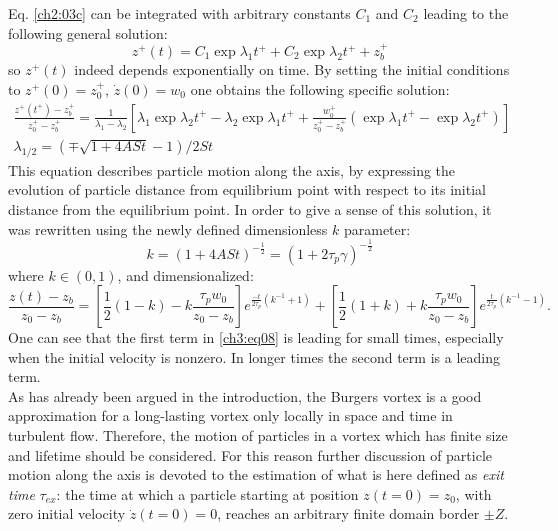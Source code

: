 \documentclass[../main.tex]{subfiles}
\begin{document}
Eq. \ref{ch2:03c} can be integrated with arbitrary constants $C_1$ and $C_2$ leading to the following general solution:
\begin{equation}
z^+(t)=C_1 \exp{\lambda_1 t^+}+C_2 \exp{\lambda_2 t^+}+z^+_b
\label{ch3:eq05}
\end{equation}
so $z^+(t)$ indeed depends exponentially on time.
By setting the initial conditions to $z^+(0)=z^+_0$, $\dot{z}(0)=w_0$ one obtains the following specific solution:
\begin{align}
\frac{z^+(t^+)-z^+_b}{z^+_0-z^+_b}=\frac{1}{\lambda_1-\lambda_2} \left[ \lambda_1 \exp{\lambda_2 t^+}-\lambda_2 \exp{\lambda_1 t^+} + \frac{w^+_0}{z^+_0-z^+_b}\left( \exp{\lambda_1 t^+}- \exp{\lambda_2 t^+}\right)\right] \\
\lambda_{1/2}=\left( \mp \sqrt{1+4 A St}-1\right)/2 St
\label{ch3:eq06}
\end{align}
This equation describes particle motion along the axis, by expressing the evolution of particle distance from equilibrium point with respect to its initial distance from the equilibrium point. In order to give a sense of this solution, it was rewritten using the newly defined dimensionless $k$ parameter:
\begin{equation}
k=(1+4 A St)^{-\frac{1}{2}}=(1+2\tau_p \gamma)^{-\frac{1}{2}}
\end{equation}
where $k \in (0,1)$, and dimensionalized:
\begin{equation}
\frac{z(t)-z_b}{z_0-z_b}=
\left[\frac{1}{2}\left(1-k\right)-k\frac{\tau_p w_0}{z_0-z_b}\right] e^{\frac{-t}{2 \tau_p}(k^{-1}+1)}+
\left[\frac{1}{2}\left(1+k\right)+k\frac{\tau_p w_0}{z_0-z_b} \right] e^{\frac{t}{2 \tau_p}(k^{-1}-1)}.
\label{ch3:eq08}
\end{equation}
One can see that the first term in \ref{ch3:eq08} is leading for small times, especially when the initial velocity is nonzero. In longer times the second term is a leading term.\\
As has already been argued in the introduction, the Burgers vortex is a good approximation for a long-lasting vortex only locally in space and time in turbulent flow. Therefore, the motion of particles in a vortex which has finite size and lifetime should be considered. For this reason further discussion of particle motion along the axis is devoted to the estimation of what is here defined as \emph{exit time} $\tau_{ex}$: the time at which a particle starting at position $z(t=0)=z_0$, with zero initial velocity $\dot{z}(t=0)=0$, reaches an arbitrary finite domain border $\pm Z$.\\
\end{document}
